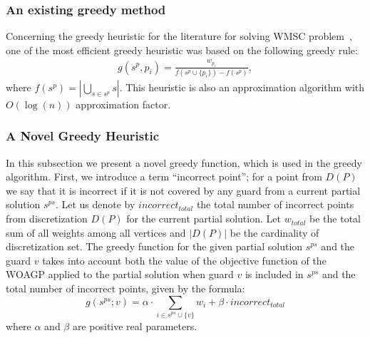 \documentclass[runningheads,a4paper]{elsarticle}
\begin{document}
	\subsubsection{An existing greedy method} 
	
	Concerning the greedy heuristic for the literature for solving WMSC problem~\cite{chvatal1979greedy, lovasz1975ratio}, one of the most efficient greedy heuristic was based on the following greedy rule:
	\begin{align}
	g(s^p, p_i) = \frac{w_{p_i}}{ f(s^p \cup \{p_i\})  - f(s^p)},
	\end{align}
	where $f(s^p) = |\bigcup_{s \in s^p} s |$.
	This heuristic is also an approximation algorithm with $O(\log(n))$ approximation factor.
	
	\subsubsection{A Novel Greedy Heuristic} 
	In this subsection we present a novel greedy function, which is used in the greedy algorithm. First, we introduce a term  ``incorrect point''; for a point from $D(P)$ we say that it is incorrect if it is not covered by any guard from a current partial solution $s^{ps}$. Let us denote by $incorrect_{total}$ the total number of incorrect points from discretization $D(P)$ for the current partial solution.  Let $w_{total}$ be the total sum of all weights among all vertices and $|D(P)|$ be the cardinality of discretization set. The greedy function for the given partial solution $s^{ps}$ and the guard $v$ takes into account both the value of the objective function of the WOAGP  applied to the partial solution when guard $v$ is included in $s^{ps}$ and the total number of incorrect points, given by the formula:
	\begin{equation}\label{eq:greedyfun2}
	g(s^{ps}; v) = \alpha \cdot \sum_{i \in s^{ps} \cup \{v\}} w_i+ \beta \cdot {incorrect_{total}}
	\end{equation}
	where $\alpha$ and $\beta$ are positive real parameters.
	
\end{document}
